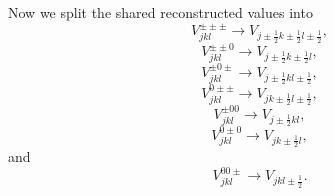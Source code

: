\documentclass{aastex63}
\begin{document}
Now we split the shared reconstructed values into
\begin{equation}
V^{\pm \pm \pm}_{j k l} \rightarrow V_{j\pm\tfrac{1}{2} k\pm\tfrac{1}{2} l\pm\tfrac{1}{2}},
\end{equation}
\begin{equation}
V^{\pm \pm 0}_{j k l} \rightarrow V_{j\pm\tfrac{1}{2} k\pm\tfrac{1}{2} l},
\end{equation}
\begin{equation}
V^{\pm 0 \pm}_{j k l} \rightarrow V_{j\pm\tfrac{1}{2} k l\pm\tfrac{1}{2}},
\end{equation}
\begin{equation}
V^{0 \pm \pm}_{j k l} \rightarrow V_{j k\pm\tfrac{1}{2} l\pm\tfrac{1}{2}},
\end{equation}
\begin{equation}
V^{\pm 0 0}_{j k l} \rightarrow V_{j\pm\tfrac{1}{2} k l},
\end{equation}
\begin{equation}
V^{0 \pm 0}_{j k l} \rightarrow V_{j k\pm\tfrac{1}{2} l},
\end{equation}
and
\begin{equation}
V^{0 0 \pm}_{j k l} \rightarrow V_{j k l\pm\tfrac{1}{2}}.
\end{equation}
\end{document}
